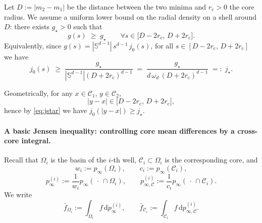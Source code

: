 Let \(D:=|m_2-m_1|\) be the distance between the two minima and \(r_{\mathrm c}>0\) the core radius.
We assume a uniform lower bound on the radial density on a shell around \(D\):
there exists \(g_\star>0\) such that
\begin{equation}\label{eq:shell-lower}
g(s)\;\ge\;g_\star
\qquad
\forall s\in\bigl[D-2r_{\mathrm c},\,D+2r_{\mathrm c}\bigr].
\end{equation}
Equivalently, since \(g(s)=|\mathbb S^{d-1}|\,s^{d-1}\,j_0(s)\), for all
\(s\in[D-2r_{\mathrm c},\,D+2r_{\mathrm c}]\) we have
\begin{equation}\label{eq:jstar}
j_0(s)
\;\ge\;
\frac{g_\star}{|\mathbb S^{d-1}|(D+2r_{\mathrm c})^{d-1}}
\;=\;
\frac{g_\star}{d\,\omega_d\,(D+2r_{\mathrm c})^{d-1}}
\;=:\; j_\star.
\end{equation}

Geometrically, for any \(x\in\mathcal C_1\), \(y\in\mathcal C_2\),
\[
|y-x|\in\bigl[D-2r_{\mathrm c},\,D+2r_{\mathrm c}\bigr],
\]
hence by \eqref{eq:jstar} we have \(j_0(|y-x|)\ge j_\star\).

\paragraph{A basic Jensen inequality: controlling core mean differences by a cross-core integral.}

Recall that \(\Omega_i\) is the basin of the \(i\)-th well,
\(\mathcal C_i\subset\Omega_i\) is the corresponding core, and
\[
w_i := p_\infty(\Omega_i),\qquad
c_i := p_\infty(\mathcal C_i),
\]
\[
p_\infty^{(i)} := \frac{1}{w_i}p_\infty(\,\cdot\,\cap\Omega_i),
\qquad
p_{\infty,\mathcal C}^{(i)} := \frac{1}{c_i}p_\infty(\,\cdot\,\cap\mathcal C_i).
\]
We write
\[
\bar f_{\Omega_i} := \int_{\Omega_i} f\,\mathrm d p_\infty^{(i)},
\qquad
\bar f_{\mathcal C_i} := \int_{\mathcal C_i} f\,\mathrm d p_{\infty,\mathcal C}^{(i)}.
\]

